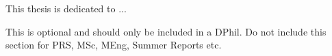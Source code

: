This thesis is dedicated to ... 
\par
This is optional and should only be included in a DPhil.
Do not include this section for PRS, MSc, MEng, Summer Reports etc.

